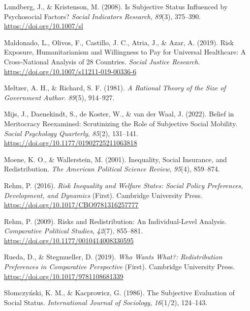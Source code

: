 \documentclass[
  12pt,
]{book}
\newlength{\cslhangindent}
\newlength{\cslentryspacingunit} %
\newenvironment{CSLReferences}[2] %
 {%
  \setlength{\parindent}{0pt}
  \ifodd #1
  \let\oldpar\par
  \def\par{\hangindent=\cslhangindent\oldpar}
  \fi
  \setlength{\parskip}{#2\cslentryspacingunit}
 }%
 {}
\begin{document}
\begin{CSLReferences}{1}{0}
\leavevmode{}%
Lundberg, J., \& Kristenson, M. (2008). Is {Subjective Status Influenced} by {Psychosocial Factors}? \emph{Social Indicators Research}, \emph{89}(3), 375--390. \url{https://doi.org/10.1007/sl}

\leavevmode{}%
Maldonado, L., Olivos, F., Castillo, J. C., Atria, J., \& Azar, A. (2019). Risk {Exposure}, {Humanitarianism} and {Willingness} to {Pay} for {Universal Healthcare}: {A Cross-National Analysis} of 28 {Countries}. \emph{Social Justice Research}. \url{https://doi.org/10.1007/s11211-019-00336-6}

\leavevmode{}%
Meltzer, A. H., \& Richard, S. F. (1981). \emph{A {Rational Theory} of the {Size} of {Government Author}}. \emph{89}(5), 914--927.

\leavevmode{}%
Mijs, J., Daenekindt, S., de Koster, W., \& van der Waal, J. (2022). Belief in {Meritocracy Reexamined}: {Scrutinizing} the {Role} of {Subjective Social Mobility}. \emph{Social Psychology Quarterly}, \emph{85}(2), 131--141. \url{https://doi.org/10.1177/01902725211063818}

\leavevmode{}%
Moene, K. O., \& Wallerstein, M. (2001). Inequality, {Social Insurance}, and {Redistribution}. \emph{The American Political Science Review}, \emph{95}(4), 859--874.

\leavevmode{}%
Rehm, P. (2016). \emph{Risk {Inequality} and {Welfare States}: {Social Policy Preferences}, {Development}, and {Dynamics}} (First). {Cambridge University Press}. \url{https://doi.org/10.1017/CBO9781316257777}

\leavevmode{}%
Rehm, P. (2009). Risks and {Redistribution}: {An Individual-Level Analysis}. \emph{Comparative Political Studies}, \emph{42}(7), 855--881. \url{https://doi.org/10.1177/0010414008330595}

\leavevmode{}%
Rueda, D., \& Stegmueller, D. (2019). \emph{Who {Wants What}?: {Redistribution Preferences} in {Comparative Perspective}} (First). {Cambridge University Press}. \url{https://doi.org/10.1017/9781108681339}

\leavevmode{}%
Słomczyński, K. M., \& Kacprowicz, G. (1986). The {Subjective Evaluation} of {Social Status}. \emph{International Journal of Sociology}, \emph{16}(1/2), 124--143.


\end{CSLReferences}
\end{document}
